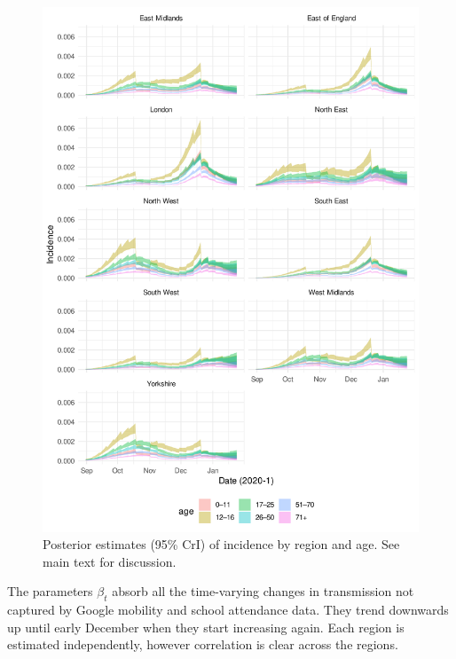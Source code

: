 \documentclass[thesis.tex]{subfiles}
\begin{document}
\begin{figure}
    \includegraphics{SEIR/CIS/incidence}
    \caption[Posterior estimates of incidence]{%
        Posterior estimates (95\% CrI) of incidence by region and age.
        See main text for discussion.
    }
    \label{SEIR:fig:incidence}
\end{figure}

The parameters $\beta_t$ absorb all the time-varying changes in transmission not captured by Google mobility and school attendance data.
They trend downwards up until early December when they start increasing again.
Each region is estimated independently, however correlation is clear across the regions.

\end{document}

